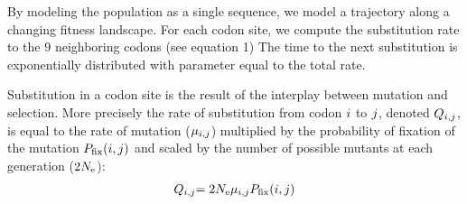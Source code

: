 By modeling the population as a single sequence, we model a trajectory along a changing fitness landscape.
For each \gls{codon} site, we compute the \gls{substitution} rate to the $9$ neighboring codons (see equation 1)  
The time to the next \gls{substitution} is exponentially distributed with parameter equal to the total rate.

\citep{Halpern1998} 

Substitution in a \gls{codon} site is the result of the interplay between mutation and selection.
More precisely the rate of \gls{substitution} from \gls{codon} ${i}$ to ${j}$, denoted $Q_{{i}, {j}}$, is equal to the rate of mutation ($\mu_{{i}, {j}}$) multiplied by the probability of fixation of the mutation $P_{\mathrm{fix}}({i}, {j})$ and scaled by the number of possible mutants at each generation ($2N_{\textrm{e}}$):
\begin{align}
{Q_{{i}, {j}}} & { = 2 N_{\textrm{e}} \mu_{{i}, {j}}  P_{\mathrm{fix}}}({i}, {j}) \\
\end{align}

